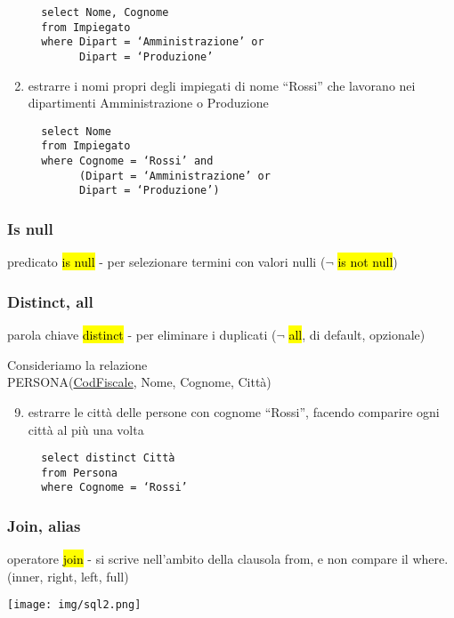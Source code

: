 \documentclass[a4paper]{article}
\begin{document}
\begin{enumerate}
\begin{verbatim}
  select Nome, Cognome
  from Impiegato
  where Dipart = ‘Amministrazione’ or
        Dipart = ‘Produzione’
  \end{verbatim}\par   \item estrarre i nomi propri degli impiegati di nome “Rossi” che lavorano nei dipartimenti Amministrazione o Produzione
  \begin{verbatim}
  select Nome
  from Impiegato
  where Cognome = ‘Rossi’ and
        (Dipart = ‘Amministrazione’ or
        Dipart = ‘Produzione’)
  \end{verbatim}
\end{enumerate}\par \subsubsection{Is null}
predicato \hl{is null} - per selezionare termini con valori nulli ($\neg$ \hl{is not null})\par \subsubsection{Distinct, all}
parola chiave \hl{distinct} - per eliminare i duplicati ($\neg$ \hl{all}, di default, opzionale)\medskip\medskip\medskip\\\par Consideriamo la relazione\\
PERSONA(\underline{CodFiscale}, Nome, Cognome, Città)\par \begin{enumerate}
  \setcounter{enumi}{8}
  \item estrarre le città delle persone con cognome “Rossi”, facendo comparire ogni città al più una volta
  \begin{verbatim}
  select distinct Città
  from Persona
  where Cognome = ‘Rossi’
  \end{verbatim}
\end{enumerate}\par \subsubsection{Join, alias}
operatore \hl{join} - si scrive nell’ambito della clausola from, e non compare il where. (inner, right, left, full)
\begin{center}
      \texttt{[image: img/sql2.png]}
\end{center}
\end{document}
